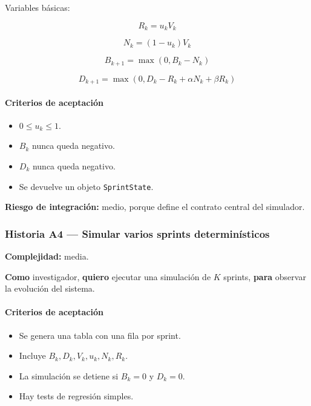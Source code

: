 \documentclass[11pt,a4paper]{article}
\begin{document}
Variables b\'asicas:

\begin{equation}
R_k = u_k V_k
\end{equation}

\begin{equation}
N_k = (1-u_k)V_k
\end{equation}

\begin{equation}
B_{k+1} = \max(0, B_k - N_k)
\end{equation}

\begin{equation}
D_{k+1} = \max(0, D_k - R_k + \alpha N_k + \beta R_k)
\end{equation}

\paragraph{Criterios de aceptaci\'on}

\begin{itemize}[leftmargin=*]
    \item $0 \leq u_k \leq 1$.
    \item $B_k$ nunca queda negativo.
    \item $D_k$ nunca queda negativo.
    \item Se devuelve un objeto \texttt{SprintState}.
\end{itemize}

\textbf{Riesgo de integraci\'on:} medio, porque define el contrato central del simulador.

\subsubsection{Historia A4 --- Simular varios sprints determin\'isticos}

\textbf{Complejidad:} media.

\textbf{Como} investigador, \textbf{quiero} ejecutar una simulaci\'on de $K$ sprints, \textbf{para} observar la evoluci\'on del sistema.

\paragraph{Criterios de aceptaci\'on}

\begin{itemize}[leftmargin=*]
    \item Se genera una tabla con una fila por sprint.
    \item Incluye $B_k,D_k,V_k,u_k,N_k,R_k$.
    \item La simulaci\'on se detiene si $B_k=0$ y $D_k=0$.
    \item Hay tests de regresi\'on simples.
\end{itemize}
\end{document}

